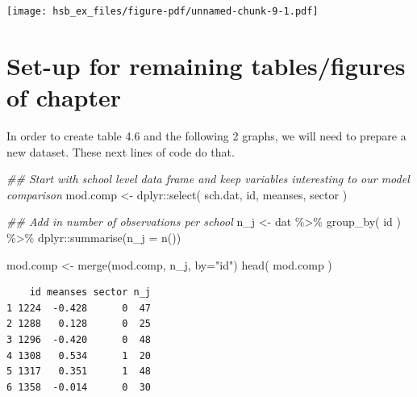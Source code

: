 \documentclass[
  letterpaper,
  DIV=11,
  numbers=noendperiod]{scrreprt}
\newenvironment{Shaded}{}{}
\newcommand{\AttributeTok}[1]{\textcolor[rgb]{0.49,0.56,0.16}{#1}}
\newcommand{\DocumentationTok}[1]{\textcolor[rgb]{0.73,0.13,0.13}{\textit{#1}}}
\newcommand{\FunctionTok}[1]{\textcolor[rgb]{0.02,0.16,0.49}{#1}}
\newcommand{\NormalTok}[1]{#1}
\newcommand{\OtherTok}[1]{\textcolor[rgb]{0.00,0.44,0.13}{#1}}
\newcommand{\SpecialCharTok}[1]{\textcolor[rgb]{0.25,0.44,0.63}{#1}}
\newcommand{\StringTok}[1]{\textcolor[rgb]{0.25,0.44,0.63}{#1}}
\begin{document}
\texttt{[image: hsb\_ex\_files/figure-pdf/unnamed-chunk-9-1.pdf]}

\section{Set-up for remaining tables/figures of
chapter}\label{set-up-for-remaining-tablesfigures-of-chapter}

In order to create table 4.6 and the following 2 graphs, we will need to
prepare a new dataset. These next lines of code do that.

\begin{Shaded}
\begin{Highlighting}[]
\DocumentationTok{\#\# Start with school level data frame and keep variables interesting to our model comparison}
\NormalTok{mod.comp }\OtherTok{\textless{}{-}}\NormalTok{ dplyr}\SpecialCharTok{::}\FunctionTok{select}\NormalTok{( sch.dat, id, meanses, sector )}

\DocumentationTok{\#\# Add in number of observations per school }
\NormalTok{n\_j }\OtherTok{\textless{}{-}}\NormalTok{ dat }\SpecialCharTok{\%\textgreater{}\%} \FunctionTok{group\_by}\NormalTok{( id ) }\SpecialCharTok{\%\textgreater{}\%}
\NormalTok{  dplyr}\SpecialCharTok{::}\FunctionTok{summarise}\NormalTok{(}\AttributeTok{n\_j =} \FunctionTok{n}\NormalTok{())}

\NormalTok{mod.comp }\OtherTok{\textless{}{-}} \FunctionTok{merge}\NormalTok{(mod.comp, n\_j, }\AttributeTok{by=}\StringTok{"id"}\NormalTok{)}
\FunctionTok{head}\NormalTok{( mod.comp )}
\end{Highlighting}
\end{Shaded}

\begin{verbatim}
    id meanses sector n_j
1 1224  -0.428      0  47
2 1288   0.128      0  25
3 1296  -0.420      0  48
4 1308   0.534      1  20
5 1317   0.351      1  48
6 1358  -0.014      0  30
\end{verbatim}
\end{document}
